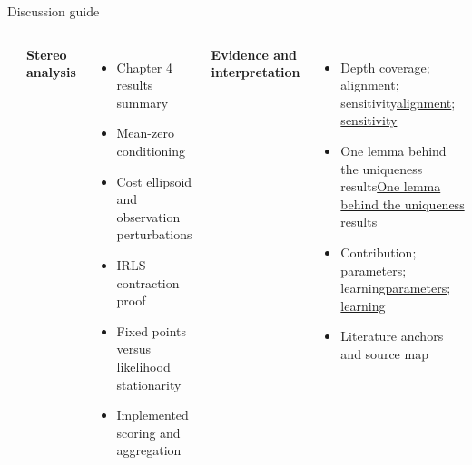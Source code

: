 \begin{frame}{Discussion guide}
\begin{columns}[T]
\begin{itemize}
\end{itemize}
\textbf{Stereo analysis}
\begin{itemize}
\item Chapter 4 results summary
\item Mean-zero conditioning
\item Cost ellipsoid and observation perturbations
\item IRLS contraction proof
\item Fixed points versus likelihood stationarity
\item Implemented scoring and aggregation
\end{itemize}
\textbf{Evidence and interpretation}
\begin{itemize}
\item Depth coverage; \ifdefined\DefenseNotes alignment; sensitivity\else\hyperlink{stereoalignment}{alignment}; \hyperlink{depthsensitivity}{sensitivity}\fi
\item \ifdefined\DefenseNotes One lemma behind the uniqueness results\else\hyperlink{complementarity}{One lemma behind the uniqueness results}\fi
\item Contribution; \ifdefined\DefenseNotes parameters; learning\else\hyperlink{paramchoice}{parameters}; \hyperlink{learnedfit}{learning}\fi
\item Literature anchors and source map
\end{itemize}
\end{columns}
\end{frame}




